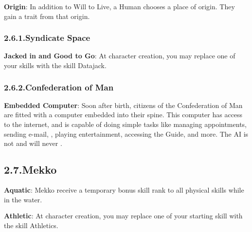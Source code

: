 \documentclass{article}
\begin{document}
\textbf{Origin}: In addition to Will to Live, a Human chooses a place of origin. They gain a trait from that origin.%

\subsubsection{2.6.1.\hspace*{0.5em}Syndicate Space}\label{sec-syndicate-space}%

\noindent{}\textbf{Jacked in and Good to Go}: At character creation, you may replace one of your skills with the skill Datajack.%

\subsubsection{2.6.2.\hspace*{0.5em}Confederation of Man}\label{sec-confederation-of-man}%

\noindent{}\textbf{Embedded Computer}: Soon after birth, citizens of the Confederation of Man are fitted with a computer embedded into their spine. This computer has access to the internet, and is capable of doing simple tasks like managing appointments, sending e-mail, , playing entertainment, accessing the Guide, and more. The AI is not  and will never .%

\subsection{2.7.\hspace*{0.5em}Mekko}\label{sec-mekko}%

\noindent{}\textbf{Aquatic}: Mekko receive a temporary bonus skill rank to all physical skills while in the water.%

\textbf{Athletic}: At character creation, you may replace one of your starting skill with the skill Athletics. %
\end{document}
